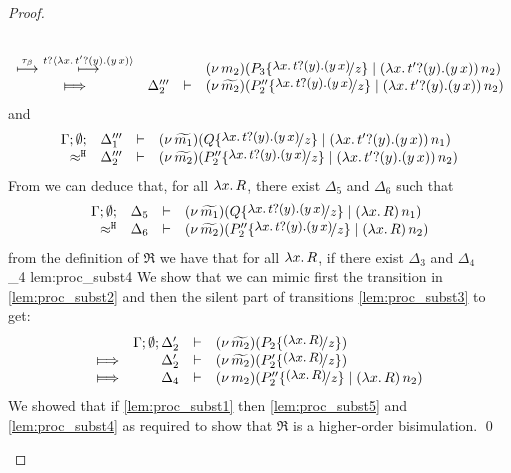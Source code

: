 \begin{proof}
\begin{enumerate}
\begin{enumerate}[(a)]
\begin{eqnarray}
\begin{array}{crll}
									\\
									{\hby{\btau}~\hby{\bactinp{t}{\trvalx{t'}}}} &
												&&	\newsp{m_2}{P_3 \subst{\trvalx{t}}{z} \Par \appl{(\trvalx{t'})}{n_2}}
									\\
									\Hby{}	& \Delta_2''' & \proves & \newsp{\widetilde{m_2}}{P_2'' \subst{\trvalx{t}}{z} \Par \appl{(\trvalx{t'})}{n_2}}
								\end{array}
								\label{lem:proc_subst3}
							\end{eqnarray}
							and
							\begin{eqnarray*}
								\mhorel{\Gamma}{\Delta_1'''}{\newsp{\widetilde{m_1}}{Q \subst{\trvalx{t}}{z} \Par \appl{(\trvalx{t'})}{n_1}}}
								{\hwb}
								{\Delta_2'''}{}{\newsp{\widetilde{m_2}}{P_2'' \subst{\trvalx{t}}{z} \Par \appl{(\trvalx{t'})}{n_2}}}
							\end{eqnarray*}
							From  we can deduce that, for all $\lambda x.\,R$, there exist $\Delta_5$ and $ \Delta_6$ such that
							\begin{eqnarray*}
								\mhorel{\Gamma}{\Delta_5}{\newsp{\widetilde{m_1}}{Q \subst{\trvalx{t}}{z} \Par \appl{(\abs{x}{R})}{n_1}}}
								{\hwb}
								{\Delta_6}{}{\newsp{\widetilde{m_2}}{P_2'' \subst{\trvalx{t}}{z} \Par \appl{(\abs{x}{R})}{n_2}}}
							\end{eqnarray*}
							from the definition of $\Re$ we have that for all $\lambda x.\,R$, if there exist $\Delta_3$ and $\Delta_4$
								{\ \Re\ }
								{\Delta_4}{}
								{lem:proc_subst4}
							We show that we can mimic first the
							transition in \eqref{lem:proc_subst2} and then the silent part of
							transitions \eqref{lem:proc_subst3} to get:
							\begin{eqnarray}
								\begin{array}{crll}
										& \Gamma; \es; \Delta_2' &\proves& \newsp{\widetilde{m_2}}{P_2 \subst{(\abs{x}{R})}{z}}
									\\
									\Hby{}	&	\Delta_2'			& \proves&	\newsp{\widetilde{m_2}}{P_2' \subst{(\abs{x}{R})}{z}}
									\\
									\Hby{} &	\Delta_4			& \proves&	\newsp{m_2}{P_2'' \subst{(\abs{x}{R})}{z} \Par \appl{(\abs{x}{R})}{n_2}}
								\end{array}
								\label{lem:proc_subst5}
							\end{eqnarray}
							We showed that if \eqref{lem:proc_subst1} then \eqref{lem:proc_subst5} and \eqref{lem:proc_subst4}
							as required to show that $\Re$ is a higher-order bisimulation.							\qed
				\end{enumerate}
	\end{enumerate}
\end{proof}



